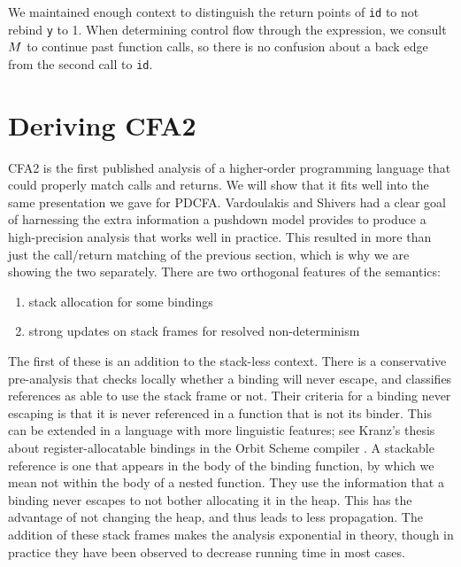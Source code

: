 \documentclass{llncs}
\begin{document}
We maintained enough context to distinguish the return points of
\texttt{id} to not rebind \texttt{y} to 1. When determining control
flow through the expression, we consult $M$ to continue past
function calls, so there is no confusion about a back edge from the
second call to \texttt{id}.

\section{Deriving CFA2}
\label{sec:cfa2}

CFA2 is the first published analysis of a higher-order programming
language that could properly match calls and returns. We will show
that it fits well into the same presentation we gave for
PDCFA. Vardoulakis and Shivers had a clear goal of harnessing the
extra information a pushdown model provides to produce a
high-precision analysis that works well in practice. This resulted in
more than just the call/return matching of the previous section, which
is why we are showing the two separately. There are two orthogonal
features of the semantics:
\begin{enumerate}
\item{stack allocation for some bindings}
\item{strong updates on stack frames for resolved non-determinism}
\end{enumerate}
The first of these is an addition to the stack-less context. There is a
conservative pre-analysis that checks locally whether a binding will
never escape, and classifies references as able to use the stack frame
or not. Their criteria for a binding never escaping is that it is
never referenced in a function that is not its binder. This can be
extended in a language with more linguistic features; see Kranz's
thesis about register-allocatable bindings in the Orbit Scheme
compiler \citep{ianjohnson:kranz:thesis:1988}. A stackable reference
is one that appears in the body of the binding function, by which we
mean not within the body of a nested function. They use the information
that a binding never escapes to not bother allocating it in the
heap. This has the advantage of not changing the heap, and thus leads
to less propagation. The addition of these stack frames makes the
analysis exponential in theory, though in practice they have been
observed to decrease running time in most cases.
\end{document}
